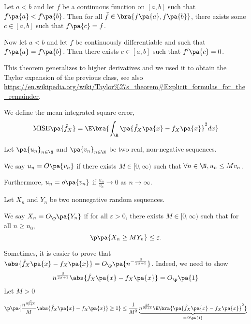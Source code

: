 \newpage
{}
\begin{theorem}\label{thm:ivt}
  Let $a<b$ and let $f$ be a continuous function on $[a,b]$ such that $f\pa{a}< f\pa{b}$. Then for all $\bar{f}\in \bra{f\pa{a},f\pa{b}}$, there exists some $c\in[a,b]$ such that $f\pa{c}= \bar{f}$.

  Now let $a< b$ and let $f$ be continuously differentiable and such that $f\pa{a} = f\pa{b}$. Then there exists $c\in [a,b]$ such that $f'\pa{c} =0$.

  This theorem generalizes to higher derivatives and we used it to obtain the Taylor expansion of the previous class, see also \url{https://en.wikipedia.org/wiki/Taylor%27s_theorem#Explicit_formulas_for_the_remainder}.
\end{theorem}
\begin{remark}

\end{remark}
\begin{definition}
  We define the mean integrated square error,
  \begin{equation}
    \mathrm{MISE}\pa{\hat{f}_X} = \E\bra{\int_\R \pa{\hat{f}_X\pa{x} - f_X\pa{x}}^2 dx}
  \end{equation}
\end{definition}

\begin{definition}
  Let $\pa{u_n}_{n\in\N}$ and $\pa{v_n}_{n\in \N}$ be two real, non-negative sequences.

  We say $u_n = O\pa{v_n}$ if there exists $M\in [0,\infty)$ such that $\forall n\in \N,u_n\leq M v_n$.

  Furthermore, $u_n = o\pa{v_n}$ if $\frac{u_n}{v_n}\rightarrow 0$ as $n\rightarrow\infty$.
\end{definition}

\begin{definition}
  Let $X_n$ and $Y_n$ be two nonnegative random sequences.

  We say $X_n = O_\p\pa{Y_n}$ if for all $\varepsilon>0$, there exists $M\in [0,\infty)$ such that for all $n\geq n_0$,
  \begin{equation}
    \p\pa{X_n \geq M Y_n}\leq \varepsilon.
  \end{equation}
\end{definition}
Sometimes, it is easier to prove that $\abs{\hat{f}_X\pa{x}-f_X\pa{x}}= O_\p \pa{n^{-\frac{\beta}{2\beta +1}}}$. Indeed, we need to show
\begin{equation}
n^{\frac{\beta}{2\beta +1 }} \abs{\hat{f}_X\pa{x}-f_X\pa{x}} = O_\p\pa{1}
\end{equation}
Let $M>0$
\begin{equation}
  \p\pa{\frac{n^{\frac{\beta}{2\beta +1 }}}{M} \abs{\hat{f}_X\pa{x}-f_X\pa{x}}\geq 1} \leq \frac{1}{M^2}\underbrace{n^{\frac{2\beta}{2\beta +1 }}\E\bra{\pa{\hat{f}_X\pa{x}-f_X\pa{x}}^2}}_{=O\pa{1}}
\end{equation}

